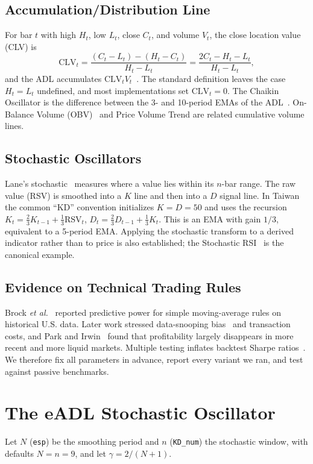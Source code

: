 \documentclass[conference]{IEEEtran}
\begin{document}
\subsection{Accumulation/Distribution Line}
For bar $t$ with high $H_t$, low $L_t$, close $C_t$, and volume $V_t$, the close location value (CLV) is
\begin{equation}
\mathrm{CLV}_t = \frac{(C_t-L_t)-(H_t-C_t)}{H_t-L_t} = \frac{2C_t - H_t - L_t}{H_t-L_t},
\end{equation}
and the ADL accumulates $\mathrm{CLV}_t V_t$~\cite{stockcharts_adl}. The standard definition leaves the case $H_t = L_t$ undefined, and most implementations set $\mathrm{CLV}_t=0$. The Chaikin Oscillator is the difference between the 3- and 10-period EMAs of the ADL~\cite{stockcharts_cho}. On-Balance Volume (OBV)~\cite{granville1963} and Price Volume Trend are related cumulative volume lines.

\subsection{Stochastic Oscillators}
Lane's stochastic~\cite{lane1984} measures where a value lies within its $n$-bar range. The raw value (RSV) is smoothed into a $K$ line and then into a $D$ signal line. In Taiwan the common ``KD'' convention initializes $K=D=50$ and uses the recursion $K_t=\tfrac23K_{t-1}+\tfrac13\mathrm{RSV}_t$, $D_t=\tfrac23D_{t-1}+\tfrac13K_t$. This is an EMA with gain $1/3$, equivalent to a 5-period EMA. Applying the stochastic transform to a derived indicator rather than to price is also established; the Stochastic RSI~\cite{chande1994} is the canonical example.

\subsection{Evidence on Technical Trading Rules}
Brock \emph{et al.}~\cite{brock1992} reported predictive power for simple moving-average rules on historical U.S. data. Later work stressed data-snooping bias~\cite{sullivan1999,white2000} and transaction costs, and Park and Irwin~\cite{park2007} found that profitability largely disappears in more recent and more liquid markets. Multiple testing inflates backtest Sharpe ratios~\cite{bailey2014}. We therefore fix all parameters in advance, report every variant we ran, and test against passive benchmarks.

\section{The eADL Stochastic Oscillator}\label{sec:def}
Let $N$ (\texttt{esp}) be the smoothing period and $n$ (\texttt{KD\_num}) the stochastic window, with defaults $N=n=9$, and let $\gamma = 2/(N+1)$.
\end{document}
